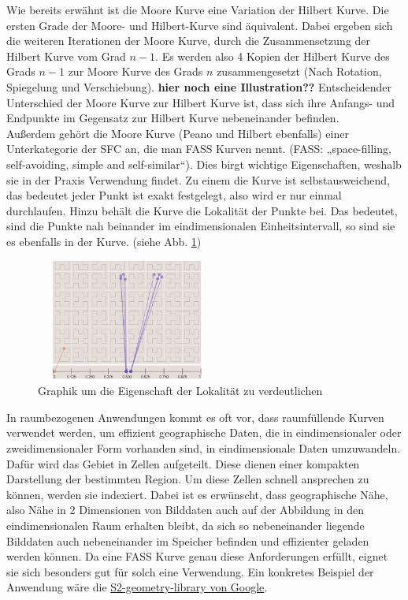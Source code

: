 \documentclass[course=erap]{aspdoc}
\begin{document}
Wie bereits erwähnt ist die Moore Kurve eine Variation der Hilbert Kurve. Die ersten Grade der Moore- und Hilbert-Kurve sind äquivalent. Dabei ergeben sich die weiteren Iterationen der Moore Kurve, durch die Zusammensetzung der Hilbert Kurve vom Grad $n - 1$.  Es werden also 4 Kopien der Hilbert Kurve des Grads $n-1$ zur Moore Kurve des Grads $n$ zusammengesetzt (Nach Rotation, Spiegelung und Verschiebung). \textbf{hier noch eine Illustration??}
Entscheidender Unterschied der Moore Kurve zur Hilbert Kurve ist, dass sich ihre Anfangs- und Endpunkte im Gegensatz zur Hilbert Kurve nebeneinander befinden.
\\
Außerdem gehört die Moore Kurve (Peano und Hilbert ebenfalls) einer Unterkategorie der SFC an, die man FASS Kurven nennt. (FASS: „space-filling, self-avoiding, simple and self-similar“).
Dies birgt wichtige Eigenschaften, weshalb sie in der Praxis Verwendung findet. Zu einem die Kurve ist selbstausweichend, das bedeutet jeder Punkt ist exakt festgelegt, also wird er nur einmal durchlaufen. Hinzu behält die Kurve die Lokalität der Punkte bei. Das bedeutet, sind die Punkte nah beinander im eindimensionalen Einheitsintervall, so sind sie es ebenfalls in der Kurve. (siehe Abb. \ref{fig:locality}) %
\begin{figure}[h]
\centering
      \includegraphics[width=6cm, height=4cm]{Locality}
    \caption{Graphik um die Eigenschaft der Lokalität zu verdeutlichen}
    \label{fig:locality}
\end{figure}
In raumbezogenen Anwendungen kommt es oft vor, dass raumfüllende Kurven verwendet werden, um effizient geographische Daten, die in eindimensionaler oder zweidimensionaler Form vorhanden sind, in eindimensionale Daten umzuwandeln. \\Dafür wird das Gebiet in Zellen aufgeteilt. Diese dienen einer kompakten Darstellung der bestimmten Region. Um diese Zellen schnell ansprechen zu können, werden sie indexiert. Dabei ist es erwünscht, dass geographische Nähe, also Nähe in 2 Dimensionen von Bilddaten auch auf der Abbildung in den eindimensionalen Raum erhalten bleibt, da sich so nebeneinander liegende Bilddaten auch nebeneinander im Speicher befinden und effizienter geladen werden können.
Da eine FASS Kurve genau diese Anforderungen erfüllt, eignet sie sich besonders gut für solch eine Verwendung. Ein konkretes Beispiel der Anwendung wäre die \href{https://code.google.com/archive/p/s2-geometry-library/}{S2-geometry-library von Google}. 
\end{document}
